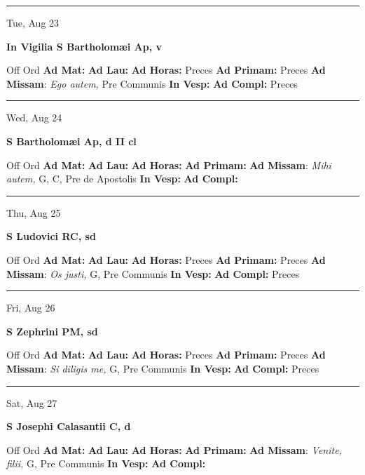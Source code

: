 \documentclass[letterpaper, 10pt]{article}
\begin{document}
\hrule
\begin{center}
Tue, Aug 23
\end{center}\textbf{ \large In Vigilia S Bartholomæi Ap, \textnormal{\normalsize v}}
\begin{justify}
Off Ord
\textbf{Ad Mat: }
\textbf{Ad Lau: }
\textbf{Ad Horas: }Preces
\textbf{Ad Primam: }Preces
\textbf{Ad Missam}: \textit{Ego autem,} Pre Communis
\textbf{In Vesp: }
\textbf{Ad Compl: }Preces\end{justify}



\hrule
\begin{center}
Wed, Aug 24
\end{center}\textbf{ \large S Bartholomæi Ap, \textnormal{\normalsize d II cl}}
\begin{justify}
Off Ord
\textbf{Ad Mat: }
\textbf{Ad Lau: }
\textbf{Ad Horas: }
\textbf{Ad Primam: }
\textbf{Ad Missam}: \textit{Mihi autem,} G, C, Pre de Apostolis
\textbf{In Vesp: }
\textbf{Ad Compl: }\end{justify}



\hrule
\begin{center}
Thu, Aug 25
\end{center}\textbf{ \large S Ludovici RC, \textnormal{\normalsize sd}}
\begin{justify}
Off Ord
\textbf{Ad Mat: }
\textbf{Ad Lau: }
\textbf{Ad Horas: }Preces
\textbf{Ad Primam: }Preces
\textbf{Ad Missam}: \textit{Os justi,} G, Pre Communis
\textbf{In Vesp: }
\textbf{Ad Compl: }Preces\end{justify}



\hrule
\begin{center}
Fri, Aug 26
\end{center}\textbf{ \large S Zephrini PM, \textnormal{\normalsize sd}}
\begin{justify}
Off Ord
\textbf{Ad Mat: }
\textbf{Ad Lau: }
\textbf{Ad Horas: }Preces
\textbf{Ad Primam: }Preces
\textbf{Ad Missam}: \textit{Si diligis me,} G, Pre Communis
\textbf{In Vesp: }
\textbf{Ad Compl: }Preces\end{justify}



\hrule
\begin{center}
Sat, Aug 27
\end{center}\textbf{ \large S Josephi Calasantii C, \textnormal{\normalsize d}}
\begin{justify}
Off Ord
\textbf{Ad Mat: }
\textbf{Ad Lau: }
\textbf{Ad Horas: }
\textbf{Ad Primam: }
\textbf{Ad Missam}: \textit{Venite, filii,} G, Pre Communis
\textbf{In Vesp: }
\textbf{Ad Compl: }\end{justify}
\end{document}
